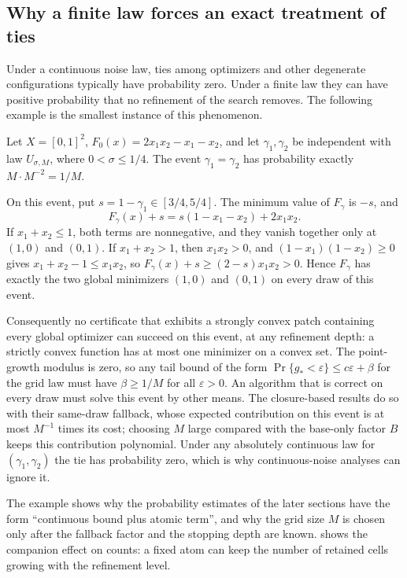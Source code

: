 \subsection{Why a finite law forces an exact treatment of ties}\label{sec:model:atom}

Under a continuous noise law, ties among optimizers and other degenerate
configurations typically have probability zero. Under a finite law they can
have positive probability that no refinement of the search removes. The
following example is the smallest instance of this phenomenon.

\begin{example}\label{ex:model:tie}
Let $X=[0,1]^2$, $F_0(x)=2x_1x_2-x_1-x_2$, and let $\gamma_1,\gamma_2$ be
independent with law $U_{\sigma,M}$, where $0<\sigma\le1/4$. The event
$\gamma_1=\gamma_2$ has probability exactly $M\cdot M^{-2}=1/M$.

On this event, put $s=1-\gamma_1\in[3/4,5/4]$. The minimum value of
$F_\gamma$ is $-s$, and
\[
 F_\gamma(x)+s=s(1-x_1-x_2)+2x_1x_2 .
\]
If $x_1+x_2\le1$, both terms are nonnegative, and they vanish together only
at $(1,0)$ and $(0,1)$. If $x_1+x_2>1$, then $x_1x_2>0$, and
$(1-x_1)(1-x_2)\ge0$ gives $x_1+x_2-1\le x_1x_2$, so
$F_\gamma(x)+s\ge(2-s)x_1x_2>0$. Hence $F_\gamma$ has exactly the two
global minimizers $(1,0)$ and $(0,1)$ on every draw of this event.

Consequently no certificate that exhibits a strongly convex patch containing
every global optimizer can succeed on this event, at any refinement depth:
a strictly convex function has at most one minimizer on a convex set. The
point-growth modulus is zero, so any tail bound of the form
$\Pr\{g_*<\varepsilon\}\le c\varepsilon+\beta$ for the grid law must have
$\beta\ge1/M$ for all $\varepsilon>0$. An algorithm that is correct on every
draw must solve this event by other means. The closure-based results do so
with their same-draw fallback, whose expected contribution on this event is
at most $M^{-1}$ times its cost; choosing $M$ large compared with the
base-only factor $B$ keeps this contribution polynomial. Under any
absolutely continuous law for $(\gamma_1,\gamma_2)$ the tie has probability
zero, which is why continuous-noise analyses can ignore it.
\end{example}

The example shows why the probability estimates of the later sections have
the form ``continuous bound plus atomic term'', and why the grid size $M$ is
chosen only after the fallback factor and the stopping depth are known.
 shows the companion effect on counts: a fixed atom can
keep the number of retained cells growing with the refinement level.
